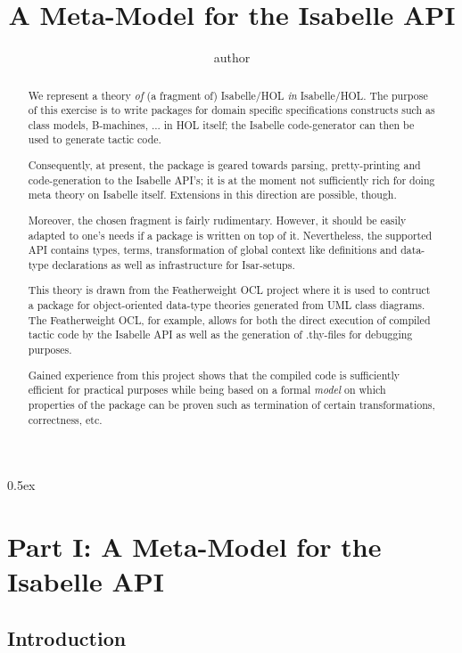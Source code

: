 \documentclass[fontsize=11pt,paper=a4,open=right,twoside,abstract=true]{scrreprt}
\begin{document}
\title{A Meta-Model for the Isabelle API}
\author{%
author
}

\maketitle

\begin{abstract}
We represent a theory \emph{of} (a fragment of) Isabelle/HOL 
\emph{in} Isabelle/HOL. The purpose of this exercise is to write packages for
domain specific specifications constructs such as class models, B-machines, ...
in HOL itself; the Isabelle code-generator can then be used to generate
tactic code.

Consequently, at present, the package is geared towards 
parsing, pretty-printing and code-generation to the Isabelle API's; 
it is at the moment not sufficiently rich for doing meta theory on 
Isabelle itself. Extensions in this direction are possible, though.

Moreover, the chosen fragment is fairly rudimentary. However, it should be 
easily adapted to one's needs if a package is written on top of it.
Nevertheless, the supported API contains types, terms, transformation of
global context like definitions and data-type declarations as well
as infrastructure for Isar-setups.

This theory is drawn from the Featherweight OCL\cite{AFP} project where 
it is used to contruct a package for object-oriented data-type theories
generated from UML class diagrams. The Featherweight OCL, for example, allows for 
both the direct execution of compiled tactic code by the Isabelle API
as well as the generation of .thy-files for debugging purposes.

Gained experience from this project shows that the compiled code is sufficiently
efficient for practical purposes while being based on a formal \emph{model}
on which properties of the package can be proven such as termination of certain
transformations, correctness, etc.
\end{abstract}
\tableofcontents

\parindent 0pt\parskip 0.5ex

%

\part{Part I: A Meta-Model for the Isabelle API }
\chapter{Introduction}


\end{document}
